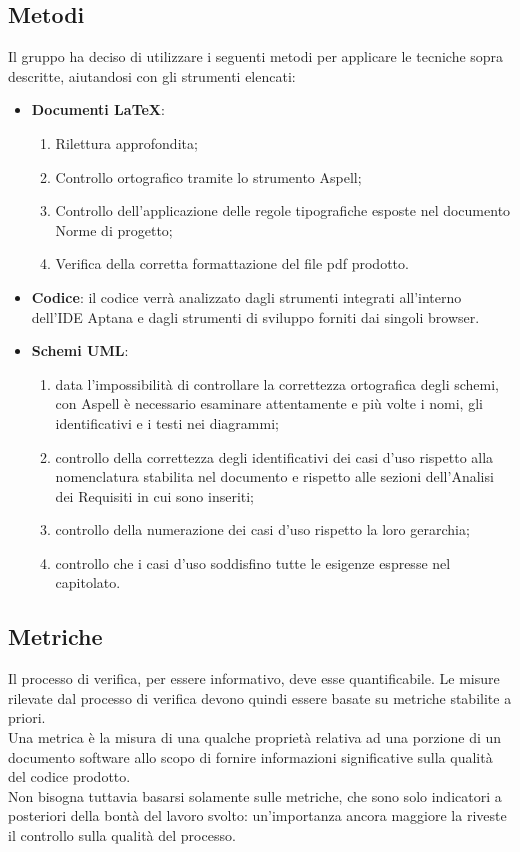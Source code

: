 {\subsection{Metodi}{
	\label{sec:Metodi}
	Il gruppo ha deciso di utilizzare i seguenti metodi per applicare le tecniche sopra descritte, aiutandosi con gli strumenti elencati:
	\begin{itemize}
		\item \textbf{Documenti \LaTeX}:
		\begin{enumerate}
			\item Rilettura approfondita;
			\item Controllo ortografico tramite lo strumento Aspell;
			\item Controllo dell'applicazione delle regole tipografiche esposte nel documento Norme di progetto;
			\item Verifica della corretta formattazione del file pdf prodotto.
		\end{enumerate}
		
		\item \textbf{Codice}: il codice verrà analizzato dagli strumenti integrati all'interno dell'IDE Aptana e dagli strumenti di sviluppo forniti dai singoli browser.
		
		\item \textbf{Schemi UML}:
		\begin{enumerate}
			\item data l'impossibilità di controllare la correttezza ortografica degli schemi, con Aspell è necessario esaminare attentamente e più volte i nomi, gli identificativi e i testi nei diagrammi;
			\item controllo della correttezza degli identificativi dei casi d'uso rispetto alla nomenclatura stabilita nel documento \NormeDiProgetto e rispetto alle sezioni dell'Analisi dei Requisiti in cui sono inseriti;
			\item controllo della numerazione dei casi d'uso rispetto la loro gerarchia;
			\item controllo che i casi d'uso soddisfino tutte le esigenze espresse nel capitolato.
		\end{enumerate}
	\end{itemize}
	}
\subsection{Metriche}{
	\label{sec:metriche}
	Il processo di verifica, per essere informativo, deve esse quantificabile. Le misure rilevate dal processo di verifica devono quindi essere basate su metriche stabilite a priori. \\
	Una metrica è la misura di una qualche proprietà relativa ad una porzione di un documento software allo scopo di fornire informazioni significative sulla qualità del codice prodotto. \\
	Non bisogna tuttavia basarsi solamente sulle metriche, che sono solo indicatori a posteriori della bontà del lavoro svolto: un'importanza ancora maggiore la riveste il controllo sulla qualità del processo.
	}
}
